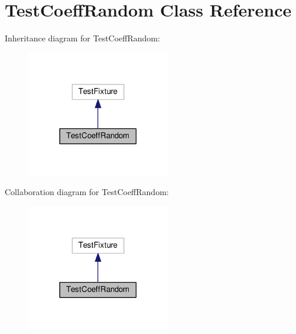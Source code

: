 \hypertarget{class_test_coeff_random}{}\section{Test\+Coeff\+Random Class Reference}
\label{class_test_coeff_random}


Inheritance diagram for Test\+Coeff\+Random\+:
\nopagebreak
\begin{figure}[H]
\begin{center}
\leavevmode
\includegraphics[width=177pt]{class_test_coeff_random__inherit__graph}
\end{center}
\end{figure}


Collaboration diagram for Test\+Coeff\+Random\+:
\nopagebreak
\begin{figure}[H]
\begin{center}
\leavevmode
\includegraphics[width=177pt]{class_test_coeff_random__coll__graph}
\end{center}
\end{figure}
